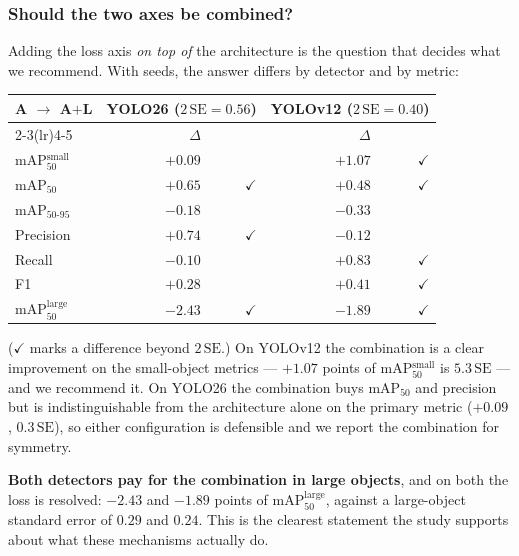\documentclass[10pt,twocolumn,a4paper]{article}
\begin{document}
\subsubsection*{Should the two axes be combined?}

Adding the loss axis \emph{on top of} the architecture is the question that
decides what we recommend. With seeds, the answer differs by detector and by
metric:

\begin{center}\small
\begin{tabular}{@{}lrrrr@{}}
\toprule
A $\rightarrow$ A$+$L & \multicolumn{2}{c}{YOLO26 ($2\,\mathrm{SE}=0.56$)} & \multicolumn{2}{c}{YOLOv12 ($2\,\mathrm{SE}=0.40$)} \\
\cmidrule(lr){2-3}\cmidrule(lr){4-5}
 & $\Delta$ & & $\Delta$ & \\
\midrule
mAP$_{50}^{\text{small}}$ & $+0.09$ &      & $+1.07$ & $\checkmark$ \\
mAP$_{50}$                & $+0.65$ & $\checkmark$ & $+0.48$ & $\checkmark$ \\
mAP$_{50\text{-}95}$      & $-0.18$ &      & $-0.33$ &      \\
Precision                 & $+0.74$ & $\checkmark$ & $-0.12$ &      \\
Recall                    & $-0.10$ &      & $+0.83$ & $\checkmark$ \\
F1                        & $+0.28$ &      & $+0.41$ & $\checkmark$ \\
mAP$_{50}^{\text{large}}$ & $-2.43$ & $\checkmark$ & $-1.89$ & $\checkmark$ \\
\bottomrule
\end{tabular}
\end{center}

\noindent ($\checkmark$ marks a difference beyond $2\,\mathrm{SE}$.) On YOLOv12
the combination is a clear improvement on the small-object metrics --- $+1.07$
points of mAP$_{50}^{\text{small}}$ is $5.3\,\mathrm{SE}$ --- and we recommend
it. On YOLO26 the combination buys mAP$_{50}$ and precision but is
indistinguishable from the architecture alone on the primary metric
($+0.09$, $0.3\,\mathrm{SE}$), so either configuration is defensible and we
report the combination for symmetry.

\textbf{Both detectors pay for the combination in large objects}, and on both
the loss is resolved: $-2.43$ and $-1.89$ points of mAP$_{50}^{\text{large}}$,
against a large-object standard error of $0.29$ and $0.24$. This is the clearest
statement the study supports about what these mechanisms actually do.
\end{document}
